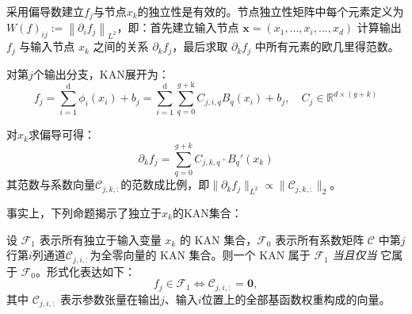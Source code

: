 采用偏导数建立$f_j$与节点$x_k$的独立性是有效的。节点独立性矩阵中每个元素定义为 $W\left( f \right) _{ij}:=\left\| \partial _if_j \right\| _{L^2}$，即：首先建立输入节点 $\boldsymbol{x}=\left( x_1,..., x_i,...,x_d \right)$ 计算输出 $f_j$ 与输入节点 $x_k$ 之间的关系 $\partial _kf_j$，最后求取 $\partial _kf_j$ 中所有元素的欧几里得范数。

对第$j$个输出分支，KAN展开为：
\begin{equation}
	f_j=\sum_{i=1}^{\mathrm{d}}{\phi _i\left( x_i \right) +b_j=\sum_{i=1}^{\mathrm{d}}{\sum_{q=0}^{g+\mathrm{k}}{C_{j,i,q}B_q\left( x_i \right)}}}+b_j,
	\quad
	C_j\in \mathbb{R} ^{d\times \left( g+k \right)}
	\label{eq4-2}
\end{equation}

对$x_k$求偏导可得：
\[
\partial_k f_j = \sum_{q=0}^{g+k} C_{j,k,q} \cdot B_q'(x_k)
\]
其范数与系数向量$\mathcal{C}_{j,k,:}$的范数成比例，即$\|\partial_k f_j\|_{L^2} \propto \|\mathcal{C}_{j,k,:}\|_2$。

事实上，下列命题揭示了独立于$x_k$的$\mathrm{KAN}$集合：
\begin{theorem}[KAN的节点独立性准则]
	设 $\mathcal{F}_1$ 表示所有独立于输入变量 $x_k$ 的 KAN 集合，$\mathcal{F}_0$ 表示所有系数矩阵 $\mathcal{C}$ 中第$j$行第$i$列通道$\mathcal{C}_{j,i,:}$为全零向量的 KAN 集合。则一个 KAN 属于 $\mathcal{F}_1$ \textit{当且仅当} 它属于 $\mathcal{F}_0$。形式化表达如下：
	$$
	f_j \in \mathcal{F}_1 \iff \mathcal{C}_{j,i,:} = \mathbf{0},
	$$
	其中 $\mathcal{C}_{j,i,:}$ 表示参数张量在输出$j$、输入$i$位置上的全部基函数权重构成的向量。
	\label{proposition2}
\end{theorem}

